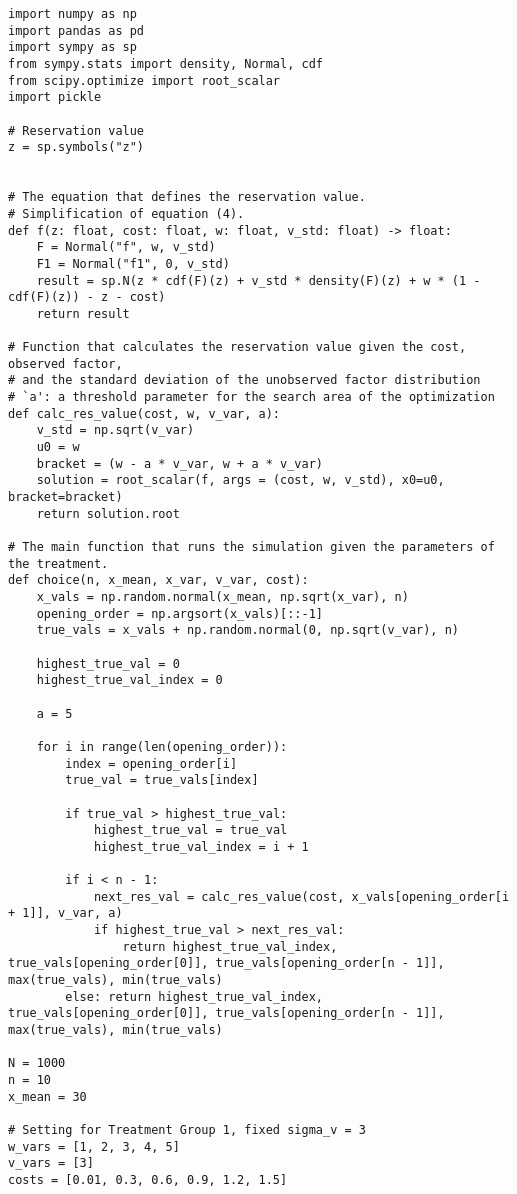 \documentclass[12pt]{article}
\begin{document}
\begin{lstlisting}
import numpy as np
import pandas as pd
import sympy as sp
from sympy.stats import density, Normal, cdf
from scipy.optimize import root_scalar
import pickle

# Reservation value
z = sp.symbols("z")


# The equation that defines the reservation value.
# Simplification of equation (4).
def f(z: float, cost: float, w: float, v_std: float) -> float:
    F = Normal("f", w, v_std)
    F1 = Normal("f1", 0, v_std)
    result = sp.N(z * cdf(F)(z) + v_std * density(F)(z) + w * (1 - cdf(F)(z)) - z - cost)
    return result

# Function that calculates the reservation value given the cost, observed factor,
# and the standard deviation of the unobserved factor distribution
# `a': a threshold parameter for the search area of the optimization
def calc_res_value(cost, w, v_var, a):
    v_std = np.sqrt(v_var)
    u0 = w
    bracket = (w - a * v_var, w + a * v_var)
    solution = root_scalar(f, args = (cost, w, v_std), x0=u0, bracket=bracket)
    return solution.root

# The main function that runs the simulation given the parameters of the treatment.
def choice(n, x_mean, x_var, v_var, cost):
    x_vals = np.random.normal(x_mean, np.sqrt(x_var), n)    
    opening_order = np.argsort(x_vals)[::-1]
    true_vals = x_vals + np.random.normal(0, np.sqrt(v_var), n)
    
    highest_true_val = 0
    highest_true_val_index = 0
    
    a = 5
    
    for i in range(len(opening_order)):
        index = opening_order[i]
        true_val = true_vals[index]
        
        if true_val > highest_true_val:
            highest_true_val = true_val
            highest_true_val_index = i + 1
        
        if i < n - 1:
            next_res_val = calc_res_value(cost, x_vals[opening_order[i + 1]], v_var, a)
            if highest_true_val > next_res_val:
                return highest_true_val_index, true_vals[opening_order[0]], true_vals[opening_order[n - 1]], max(true_vals), min(true_vals)
        else: return highest_true_val_index, true_vals[opening_order[0]], true_vals[opening_order[n - 1]], max(true_vals), min(true_vals)

N = 1000
n = 10
x_mean = 30

# Setting for Treatment Group 1, fixed sigma_v = 3
w_vars = [1, 2, 3, 4, 5]
v_vars = [3]
costs = [0.01, 0.3, 0.6, 0.9, 1.2, 1.5]


\end{lstlisting}
\end{document}
